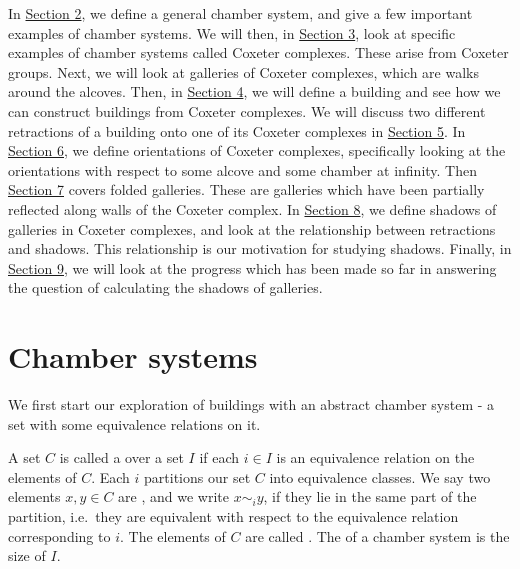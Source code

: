 \documentclass[11pt]{article}
\begin{document}



In \hyperref[2]{Section 2}, we define a general chamber system, and give a few important examples of chamber systems. We will then, in \hyperref[3]{Section 3}, look at specific examples of chamber systems called Coxeter complexes. These arise from Coxeter groups. Next, we will look at galleries of Coxeter complexes, which are walks around the alcoves. Then, in \hyperref[4]{Section 4}, we will define a building and see how we can construct buildings from Coxeter complexes. We will discuss two different retractions of a building onto one of its Coxeter complexes in \hyperref[5]{Section 5}. In \hyperref[6]{Section 6}, we define orientations of Coxeter complexes, specifically looking at the orientations with respect to some alcove and some chamber at infinity. Then \hyperref[7]{Section 7} covers folded galleries. These are galleries which have been partially reflected along walls of the Coxeter complex. In \hyperref[8]{Section 8}, we define shadows of galleries in Coxeter complexes, and look at the relationship between retractions and shadows. This relationship is our motivation for studying shadows. Finally, in \hyperref[9]{Section 9}, we will look at the progress which has been made so far in answering the question of calculating the shadows of galleries. 




\section{Chamber systems} \label{2}
We first start our exploration of buildings with an abstract chamber system - a set with some equivalence relations on it.  

\begin{definition}
    A set $C$ is called a  over a set $I$ if each $i\in I$ is an equivalence relation on the elements of $C$. Each $i$ partitions our set $C$ into equivalence classes. We say two elements $x,y\in C$ are , and we write $x\sim_{i} y$, if they lie in the same part of the partition, i.e.\ they are equivalent with respect to the equivalence relation corresponding to $i$. The elements of $C$ are called . The  of a chamber system is the size of $I$. 
\end{definition}
\end{document}

